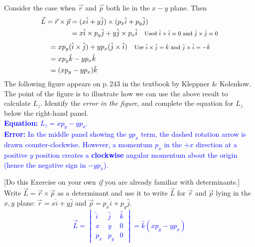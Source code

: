 \documentclass[11pt, letterpaper, openany]{book}
\newenvironment{exercise}[1][Exercise]{%
  \tcolorbox[blanker, breakable, left=1em,
    before skip=1em, after skip=1em,
    borderline west={3pt}{0pt}{PhysNavy},
    colback=PhysCream,
    before upper={\textcolor{PhysNavy}{\sffamily\bfseries #1:}\space}
  ]%
}{%
  \endtcolorbox%
}
\begin{document}
\begin{exercise}[Exercise 4]
Consider the case when $\vec{r}$ and $\vec{p}$ both lie in the $x-y$ plane. Then
\begin{align*}
    \vec{L} = \vec{r} \times \vec{p} &= (x\hat{i} + y\hat{j}) \times (p_x\hat{i} + p_y\hat{j}) \\
    &= x\hat{i} \times p_y\hat{j} + y\hat{j} \times p_x\hat{i} \quad \text{\footnotesize{Used $\hat{i}\times\hat{i}=0$ and $\hat{j}\times\hat{j}=0$}}
\end{align*}
\textcolor{blue}{
\begin{align*}
    &= x p_y (\hat{i} \times \hat{j}) + y p_x (\hat{j} \times \hat{i}) \quad \text{\footnotesize{Use $\hat{i}\times\hat{j} = \hat{k}$ and $\hat{j}\times\hat{i} = -\hat{k}$}} \\
    &= x p_y \hat{k} - y p_x \hat{k} \\
    &= (x p_y - y p_x)\hat{k}
\end{align*}
}
The following figure appears on p.\,243 in the textbook by Kleppner \& Kolenkow. The point of the figure is to illustrate how we can use the above result to calculate $L_z$. Identify the \textit{error in the figure}, and complete the equation for $L_z$ below the right-hand panel. \\
\textcolor{blue}{
\textbf{Equation:} $L_z = x p_y - y p_x$. \\
\textbf{Error:} In the middle panel showing the $y p_x$ term, the dashed rotation arrow is drawn counter-clockwise. However, a momentum $p_x$ in the $+x$ direction at a positive $y$ position creates a \textbf{clockwise} angular momentum about the origin (hence the negative sign in $-y p_x$).
}
\end{exercise}

\begin{exercise}[Optional Exercise 5]
[Do this Exercise on your own \textit{if} you are already familiar with determinants.] Write $\vec{L} = \vec{r} \times \vec{p}$ as a determinant and use it to write $\vec{L}$ for $\vec{r}$ and $\vec{p}$ lying in the $x, y$ plane: $\vec{r} = x\hat{i} + y\hat{j}$ and $\vec{p} = p_x\hat{i} + p_y\hat{j}$. \\
\textcolor{blue}{
\[ \vec{L} = \begin{vmatrix} \hat{i} & \hat{j} & \hat{k} \\ x & y & 0 \\ p_x & p_y & 0 \end{vmatrix} = \hat{k}(x p_y - y p_x) \]
}
\end{exercise}
\end{document}
